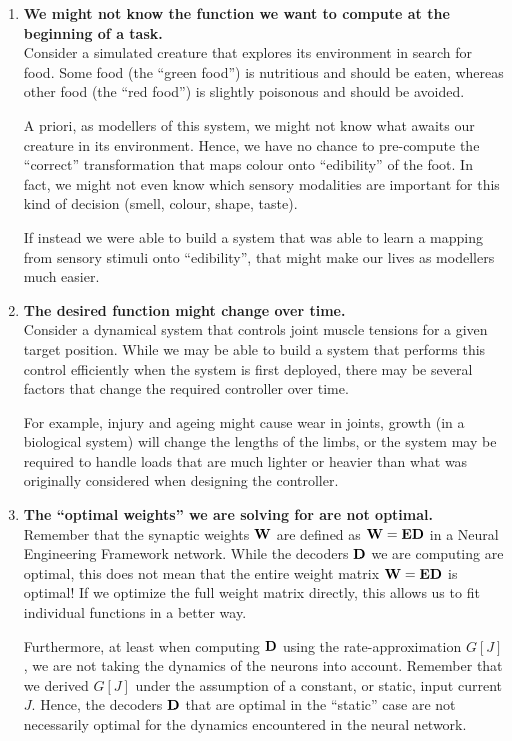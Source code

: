 \documentclass[10pt,letterpaper,oneside]{article}
\begin{document}
\begin{enumerate}[1.]
	\item \textbf{We might not know the function we want to compute at the beginning of a task.}\\
	Consider a simulated creature that explores its environment in search for food. Some food (the \enquote{green food}) is nutritious and should be eaten, whereas other food (the \enquote{red food}) is slightly poisonous and should be avoided.
	
	A priori, as modellers of this system, we might not know what awaits our creature in its environment. Hence, we have no chance to pre-compute the \enquote{correct} transformation that maps colour onto \enquote{edibility} of the foot. In fact, we might not even know which sensory modalities are important for this kind of decision (smell, colour, shape, taste\textellipsis).

	If instead we were able to build a system that was able to learn a mapping from sensory stimuli onto \enquote{edibility}, that might make our lives as modellers much easier.

	\item \textbf{The desired function might change over time.}\\
	Consider a dynamical system that controls joint muscle tensions for a given target position. While we may be able to build a system that performs this control efficiently when the system is first deployed, there may be several factors that change the required controller over time.

	For example, injury and ageing might cause wear in joints, growth (in a biological system) will change the lengths of the limbs, or the system may be required to handle loads that are much lighter or heavier than what was originally considered when designing the controller.

	\item \textbf{The \enquote{optimal weights} we are solving for are not optimal.}\\
	Remember that the synaptic weights ${\mathbf{W}}$ are defined as ${\mathbf{W}} = {\mathbf{E}} {\mathbf{D}}$ in a Neural Engineering Framework network. While the decoders ${\mathbf{D}}$ we are computing are optimal, this does not mean that the entire weight matrix ${\mathbf{W}} = {\mathbf{E}} {\mathbf{D}}$ is optimal! If we optimize the full weight matrix directly, this allows us to fit individual functions in a better way.
	
	Furthermore, at least when computing ${\mathbf{D}}$ using the rate-approximation $G[J]$, we are not taking the dynamics of the neurons into account. Remember that we derived $G[J]$ under the assumption of a constant, or static, input current $J$. Hence, the decoders ${\mathbf{D}}$ that are optimal in the \enquote{static} case are not necessarily optimal for the dynamics encountered in the neural network.


\end{enumerate}
\end{document}
